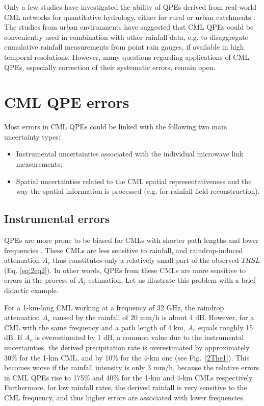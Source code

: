 \documentclass{ctuthesis}\usepackage[]{graphicx}\usepackage[]{color}
\begin{document}
Only a few studies have investigated the ability of QPEs derived from real-world CML networks for quantitative hydrology, either for rural \citep{brauerEffectDifferencesRainfall2016, cazzanigaCalculatingHydrologicalResponse2020, smiatekPotentialCommercialMicrowave2017}  or urban catchments \citep{dischImpactDifferentSources2019, stranskyRunoffPredictionUsing2018}. The studies from urban environments have suggested that CML QPEs could be conveniently used in combination with other rainfall data, e.g. to disaggregate cumulative rainfall measurements from point rain gauges, if available in high temporal resolutions. However, many questions regarding  applications of CML QPEs, especially correction of their systematic errors, remain open.



\section{CML QPE errors}

Most errors in CML QPEs could be linked with the following two main uncertainty types: 
\begin{itemize}
        \item Instrumental uncertainties associated with the individual microwave link measurements; 
        \item Spatial uncertainties related to the CML spatial representativeness and the way the spatial information is processed (e.g. for rainfall field reconstruction).
\end{itemize}


\subsection{Instrumental errors} \label{InstErr}

QPEs are more prone to be biased for CMLs with shorter path lengths and lower frequencies \citep{leijnseMicrowaveLinkRainfall2008}. These CMLs are less sensitive to rainfall, and raindrop-induced attenuation $A_r$ thus constitutes only a relatively small part of the observed $TRSL$ (Eq. \ref{eq:2eq2}). In other words, QPEs from these CMLs are more sensitive to errors in the process of $A_r$ estimation. Let us illustrate this problem with a brief didactic example. 

For a 1-km-long CML working at a frequency of 32 GHz, the raindrop attenuation $A_r$ caused by the rainfall of 20 mm/h is about 4 dB. However, for a CML with the same frequency and a path length of 4 km, $A_r$ equals roughly 15 dB. If $A_r$ is overestimated by 1 dB, a common value due to the instrumental uncertainties, the derived precipitation rate is overestimated by approximately 30\% for the 1-km CML, and by 10\% for the 4-km one (see Fig.~\ref{2The1}). This becomes worse if the rainfall intensity is only 3 mm/h, because the relative errors in CML QPEs rise to 175\% and 40\% for the 1-km and 4-km CMLs respectively. Furthermore, for low rainfall rates, the derived rainfall is very sensitive to the CML frequency, and thus higher errors are associated with lower frequencies.
\end{document}
